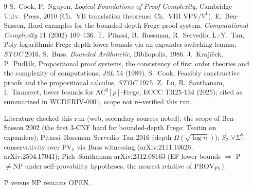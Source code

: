 \documentclass[11pt]{article}
\theoremstyle{definition}
\begin{document}
\begin{thebibliography}{9}
 S.~Cook, P.~Nguyen, \emph{Logical Foundations of Proof Complexity}, Cambridge Univ.\ Press, 2010 (Ch.~VII translation theorems; Ch.~VIII VPV/$V^1$).
 E.~Ben-Sasson, Hard examples for the bounded depth Frege proof system, \emph{Computational Complexity} 11 (2002) 109--136.
 T.~Pitassi, B.~Rossman, R.~Servedio, L.-Y.~Tan, Poly-logarithmic Frege depth lower bounds via an expander switching lemma, \emph{STOC} 2016.
 S.~Buss, \emph{Bounded Arithmetic}, Bibliopolis, 1986.
 J.~Krajíček, P.~Pudlák, Propositional proof systems, the consistency of first order theories and the complexity of computations, \emph{JSL} 54 (1989).
 S.~Cook, Feasibly constructive proofs and the propositional calculus, \emph{STOC} 1975.
 Z.~Lu, R.~Santhanam, I.~Tzameret, lower bounds for $\mathrm{AC}^0[p]$-Frege, ECCC TR25-134 (2025); cited as summarized in WCDERIV-0001, scope not re-verified this run.
\end{thebibliography}
\noindent Literature checked this run (web, secondary sources noted): the scope of Ben-Sasson 2002 (the first 3-CNF hard for
bounded-depth Frege: Tseitin on expanders); Pitassi--Rossman--Servedio--Tan 2016 (depth $\Omega(\sqrt{\log n})$);
$S^1_2$ $\forall\Sigma^b_1$-conservativity over $\mathrm{PV}_1$ via Buss witnessing (arXiv:2111.10626, arXiv:2504.17041);
Pich--Santhanam arXiv:2312.08163 (EF lower bounds $\Rightarrow$ P$\ne$NP under self-provability hypotheses, the nearest relative of $\mathrm{PROV}_{\mathrm{PV}}$).

\noindent P versus NP remains OPEN.
\end{document}
